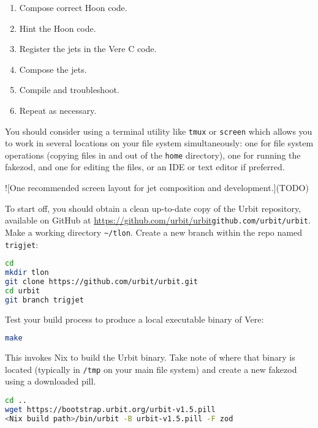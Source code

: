 \begin{example}
\begin{enumerate}
  \item  Compose correct Hoon code.
  \item  Hint the Hoon code.
  \item  Register the jets in the Vere C code.
  \item  Compose the jets.
  \item  Compile and troubleshoot.
  \item  Repeat as necessary.
\end{enumerate}

You should consider using a terminal utility like \texttt{tmux} or \texttt{screen} which allows you to work in several locations on your file system simultaneously:  one for file system operations (copying files in and out of the \texttt{home} directory), one for running the fakezod, and one for editing the files, or an IDE or text editor if preferred.

![One recommended screen layout for jet composition and development.](TODO)

To start off, you should obtain a clean up-to-date copy of the Urbit repository, available on GitHub at \url{https://github.com/urbit/urbit}{\texttt{github.com/urbit/urbit}}.  Make a working directory \texttt{\textasciitilde/tlon}.  Create a new branch within the repo named \texttt{trigjet}:

\begin{lstlisting}[caption={Terminal 1 (Bash)},
                   language=bash,
                   style=nonumbers]
cd
mkdir tlon
git clone https://github.com/urbit/urbit.git
cd urbit
git branch trigjet
\end{lstlisting}

Test your build process to produce a local executable binary of Vere:

\begin{lstlisting}[caption={Terminal 1 (Bash)},
                   language=bash,
                   style=nonumbers]
make
\end{lstlisting}

This invokes Nix to build the Urbit binary.  Take note of where that binary is located (typically in \texttt{/tmp} on your main file system) and create a new fakezod using a downloaded pill.

\begin{lstlisting}[caption={Terminal 1 (Bash)},
                   language=bash,
                   style=nonumbers]
cd ..
wget https://bootstrap.urbit.org/urbit-v1.5.pill
<Nix build path>/bin/urbit -B urbit-v1.5.pill -F zod
\end{lstlisting}


\end{example}
